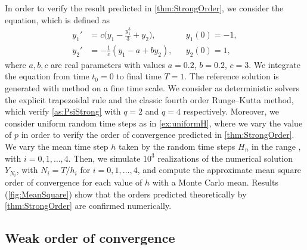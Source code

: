 \documentclass[10pt]{article}
\begin{document}
In order to verify the result predicted in \cref{thm:StrongOrder}, we consider the  equation, which is defined as
\begin{equation}\label{eq:FitzNag}
\begin{aligned}
y_1' &= c\big(y_1 - \frac{y_1^3}{3} + y_2\big), && y_1(0) = -1, \\
y_2' &= -\frac{1}{c}(y_1 - a + by_2), && y_2(0) = 1,
\end{aligned}
\end{equation}
where $a, b, c$ are real parameters with values $a = 0.2$, $b = 0.2$, $c = 3$. We integrate the equation from time $t_0 = 0$ to final time $T = 1$. The reference solution is generated with  method on a fine time scale. We consider as deterministic solvers the explicit trapezoidal rule and the classic fourth order Runge--Kutta method, which verify \cref{as:PsiStrong} with $q = 2$ and $q = 4$ respectively. Moreover, we consider uniform random time steps as in \cref{ex:uniformH}, where we vary the value of $p$  in order to verify the order of convergence predicted in \cref{thm:StrongOrder}.  We vary the mean time step $h$ taken by the random time steps $H_n$ in the range , with $i = 0, 1, \ldots, 4$. Then, we simulate $10^3$ realizations of the numerical solution $Y_{N_i}$, with $N_i = T / h_i$ for $i = 0, 1, \ldots, 4$, and compute the approximate mean square order of convergence for each value of $h$ with a Monte Carlo mean. Results (\cref{fig:MeanSquare}) show that the orders predicted theoretically by \cref{thm:StrongOrder} are confirmed numerically. 

\subsection{Weak order of convergence}
\end{document}
